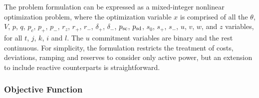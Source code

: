 \documentclass[12pt]{article}
\numberwithin{equation}{section}
\numberwithin{table}{section}
\numberwithin{figure}{section}
\begin{document}
The problem formulation can be expressed as a mixed-integer nonlinear optimization problem, where the optimization variable $x$ is comprised of all the $\theta$, $V$, $p$, $q$, $p_c$, $p_+$, $p_-$, $r_z$, $r_+$, $r_-$, $\delta_+$, $\delta_-$, $p_{\rm sc}$, $p_{\rm sd}$, $s_0$, $s_+$, $s_-$, $u$, $v$, $w$, and $z$ variables, for all $t$, $j$, $k$, $i$ and $l$. The $u$ commitment variables are binary and the rest continuous. For simplicity, the formulation restricts the treatment of costs, deviations, ramping and reserves to consider only active power, but an extension to include reactive counterparts is straightforward.

\subsubsection{Objective Function}
\end{document}
